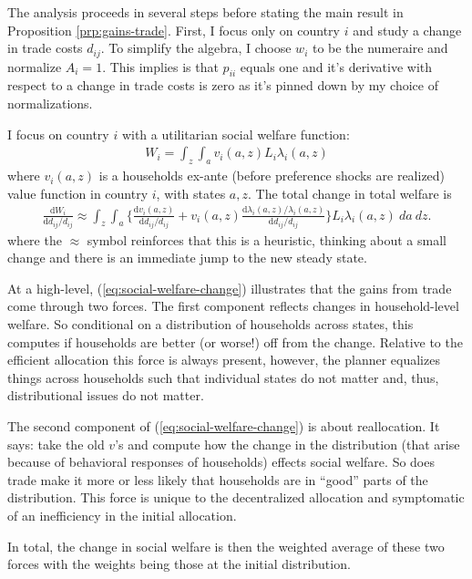 \documentclass[12pt,pdftex]{article}
\begin{document}
\begin{onehalfspacing}
The analysis proceeds in several steps before stating the main result in Proposition \ref{prp:gains-trade}. First, I focus only on country $i$ and study a change in trade costs $d_{ij}$. To simplify the algebra, I choose $w_i$ to be the numeraire and normalize $A_i = 1$. This implies is that $p_{ii}$ equals one and it's derivative with respect to a change in trade costs is zero as it's pinned down by my choice of normalizations.

I focus on country $i$ with a utilitarian social welfare function:
\begin{align}
W_{i} = \int_{z} \int_{a}  v_{i}(a,z) L_i \lambda_{i}(a,z)
\label{eq:social-welfare}
\end{align}
where $v_{i}(a,z)$ is a households ex-ante (before preference shocks are realized) value function in country $i$, with states $a,z$. The total change in total welfare is
\begin{align}
\frac{\mathrm{d} W_{i}}{\mathrm{d} d_{ij} / d_{ij}} \approx \int_{z} \int_{a} \bigg \{ \frac{\mathrm{d} v_i(a, z)}{\mathrm{d} d_{ij} / d_{ij}}  + v_{i}(a,z) \frac{\mathrm{d} \lambda_{i}(a,z)/ \lambda_{i}(a,z)}{\mathrm{d} d_{ij} / d_{ij}}  \bigg \} L_i \lambda_{i}(a,z) \ da \ dz.
\label{eq:social-welfare-change}
\end{align}
where the $\approx$ symbol reinforces that this is a heuristic, thinking about a small change and there is an immediate jump to the new steady state.

At a high-level, (\ref{eq:social-welfare-change}) illustrates that the gains from trade come through two forces. The first component reflects changes in household-level welfare. So conditional on a distribution of households across states, this computes if households are better (or worse!) off from the change. Relative to the efficient allocation this force is always present, however, the planner equalizes things across households such that individual states do not matter and, thus, distributional issues do not matter.

The second component of (\ref{eq:social-welfare-change}) is about reallocation. It says: take the old $v$'s and compute how the change in the distribution (that arise because of behavioral responses of households) effects social welfare. So does trade make it more or less likely that households are in ``good'' parts of the distribution. This force is unique to the decentralized allocation and symptomatic of an inefficiency in the initial allocation.

In total, the change in social welfare is then the weighted average of these two forces with the weights being those at the initial distribution.


\end{onehalfspacing}
\end{document}
